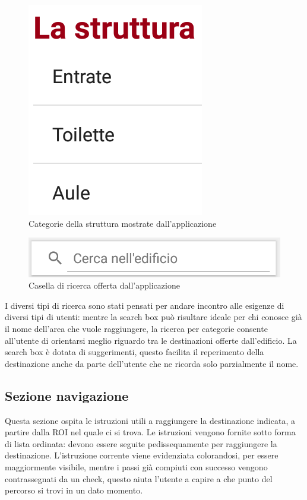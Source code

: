 \documentclass[../Sperimentazione.tex]{subfiles}
\begin{document}
			\begin{figure} [h]
				\centering
				\includegraphics[scale=0.25]{img/list_poi_category}
				\caption{Categorie della struttura mostrate dall'applicazione}
				\label{fig:ListPoiCategory}
			\end{figure}
			
			\begin{figure} [h]
				\centering
				\includegraphics[scale=0.25]{img/searchbox}
				\caption{Casella di ricerca offerta dall'applicazione}
				\label{fig:SearchBox}
			\end{figure}
		
		I diversi tipi di ricerca sono stati pensati per andare incontro alle esigenze di diversi tipi di utenti: mentre la search box può risultare ideale per chi conosce già il nome dell'area che vuole raggiungere, la ricerca per categorie consente all'utente di orientarsi meglio riguardo tra le destinazioni offerte dall'edificio. 
		La search box è dotata di suggerimenti, questo facilita il reperimento della destinazione anche da parte dell'utente che ne ricorda solo parzialmente il nome.

		\subsection{Sezione navigazione}
			Questa sezione ospita le istruzioni utili a raggiungere la destinazione indicata, a partire dalla ROI nel quale ci si trova.
			Le istruzioni vengono fornite sotto forma di lista ordinata: devono essere seguite pedissequamente per raggiungere la destinazione.
			L'istruzione corrente viene evidenziata colorandosi, per essere maggiormente visibile, mentre i passi già compiuti con successo vengono contrassegnati da un check, questo aiuta l'utente a capire a che punto del percorso si trovi in un dato momento.
\end{document}
